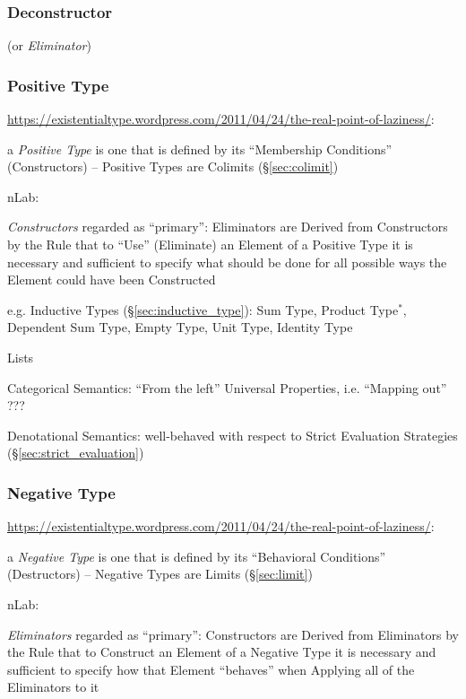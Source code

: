 \subsubsection{Deconstructor}\label{sec:deconstructor}

(or \emph{Eliminator})



\subsubsection{Positive Type}\label{sec:positive_type}

\url{https://existentialtype.wordpress.com/2011/04/24/the-real-point-of-laziness/}:

a \emph{Positive Type} is one that is defined by its ``Membership
Conditions'' (Constructors) -- Positive Types are Colimits
(\S\ref{sec:colimit})

nLab:

\emph{Constructors} regarded as ``primary'': Eliminators are Derived
from Constructors by the Rule that to ``Use'' (Eliminate) an Element
of a Positive Type it is necessary and sufficient to specify what
should be done for all possible ways the Element could have been
Constructed

e.g. Inductive Types (\S\ref{sec:inductive_type}): Sum Type, Product
Type$^*$, Dependent Sum Type, Empty Type, Unit Type, Identity Type

Lists

Categorical Semantics: ``From the left'' Universal Properties, i.e.
``Mapping out'' ???

Denotational Semantics: well-behaved with respect to Strict Evaluation
Strategies (\S\ref{sec:strict_evaluation})



\subsubsection{Negative Type}\label{sec:negative_type}

\url{https://existentialtype.wordpress.com/2011/04/24/the-real-point-of-laziness/}:

a \emph{Negative Type} is one that is defined by its ``Behavioral
Conditions'' (Destructors) -- Negative Types are Limits
(\S\ref{sec:limit})

nLab:

\emph{Eliminators} regarded as ``primary'': Constructors are Derived
from Eliminators by the Rule that to Construct an Element of a
Negative Type it is necessary and sufficient to specify how that
Element ``behaves'' when Applying all of the Eliminators to it


